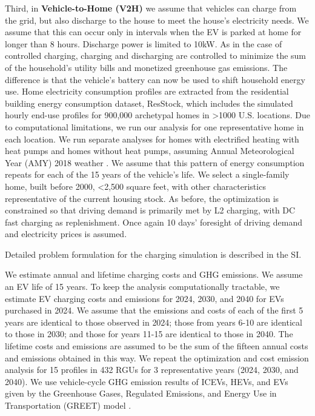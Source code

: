 \documentclass[11pt,preprint]{elsarticle}
\begin{document}
Third, in \textbf{Vehicle-to-Home (V2H)} we assume that vehicles can charge from the grid, but also discharge to the house to meet the house's electricity needs. We assume that this can occur only in intervals when the EV is parked at home for longer than 8 hours. Discharge power is limited to 10kW.  As in the case of controlled charging, charging and discharging are controlled to minimize the sum of the household's utility bills and monetized greenhouse gas emissions. The difference is that the vehicle's battery can now be used to shift household energy use. Home electricity consumption profiles are extracted from the residential building energy consumption dataset, ResStock, which includes the simulated hourly end-use profiles for 900,000 archetypal homes in >1000 U.S. locations. Due to computational limitations, we run our analysis for one representative home in each location. We run separate analyses for homes with electrified heating with heat pumps and homes without heat pumps, assuming Annual Meteorological Year (AMY) 2018 weather \cite{wilson_end-use_2022}. We assume that this pattern of energy consumption repeats for each of the 15 years of the vehicle's life. We select a single-family home, built before 2000, <2,500 square feet, with other characteristics representative of the current housing stock. As before, the optimization is constrained so that driving demand is primarily met by L2 charging, with DC fast charging as replenishment. Once again 10 days' foresight of driving demand and electricity prices is assumed. 

Detailed problem formulation for the charging simulation is described in the SI. 

We estimate annual and lifetime charging costs and GHG emissions. We assume an EV life of 15 years. To keep the analysis computationally tractable, we estimate EV charging costs and emissions for 2024, 2030, and 2040 for EVs purchased in 2024. We assume that the emissions and costs of each of the first 5 years are identical to those observed in 2024; those from years 6-10 are identical to those in 2030; and those for years 11-15 are identical to those in 2040. The lifetime costs and emissions are assumed to be the sum of the fifteen annual costs and emissions obtained in this way. We repeat the optimization and cost emission analysis for 15 profiles in 432 RGUs for 3 representative years (2024, 2030, and 2040). We use vehicle-cycle GHG emission results of ICEVs, HEVs, and EVs given by the Greenhouse Gases, Regulated Emissions, and Energy Use in Transportation (GREET) model \cite{wang_greenhouse_2023}.
\end{document}
